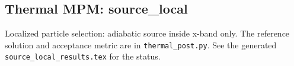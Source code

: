 \subsection{Thermal MPM: source\_local}
Localized particle selection: adiabatic source inside x-band only. The reference solution and acceptance metric are in \texttt{thermal\_post.py}. See the generated \texttt{source\_local\_results.tex} for the status.
